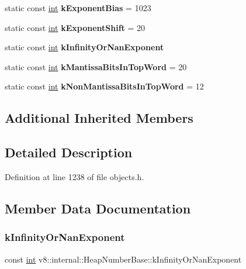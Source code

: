 \begin{DoxyCompactItemize}
static const \mbox{\hyperlink{classint}{int}} {\bfseries k\+Exponent\+Bias} = 1023
\item 
\mbox{\label{classv8_1_1internal_1_1HeapNumberBase_a5e500a46e0aef75cb934f0f2f9485347}} 
static const \mbox{\hyperlink{classint}{int}} {\bfseries k\+Exponent\+Shift} = 20
\item 
static const \mbox{\hyperlink{classint}{int}} {\bfseries k\+Infinity\+Or\+Nan\+Exponent}
\item 
\mbox{\label{classv8_1_1internal_1_1HeapNumberBase_a0dcd1eaefe47c839d9f6f9552e06b085}} 
static const \mbox{\hyperlink{classint}{int}} {\bfseries k\+Mantissa\+Bits\+In\+Top\+Word} = 20
\item 
\mbox{\label{classv8_1_1internal_1_1HeapNumberBase_a19495a439dc49a51dc7622b52909c2a1}} 
static const \mbox{\hyperlink{classint}{int}} {\bfseries k\+Non\+Mantissa\+Bits\+In\+Top\+Word} = 12
\end{DoxyCompactItemize}
\subsection*{Additional Inherited Members}


\subsection{Detailed Description}


Definition at line 1238 of file objects.\+h.



\subsection{Member Data Documentation}
\mbox{\label{classv8_1_1internal_1_1HeapNumberBase_a922e2190daca1bdcc09489b13ccab4d1}} 
\subsubsection{\texorpdfstring{k\+Infinity\+Or\+Nan\+Exponent}{kInfinityOrNanExponent}}
{\footnotesize\ttfamily const \mbox{\hyperlink{classint}{int}} v8\+::internal\+::\+Heap\+Number\+Base\+::k\+Infinity\+Or\+Nan\+Exponent\hspace{0.3cm}{\ttfamily [static]}}

